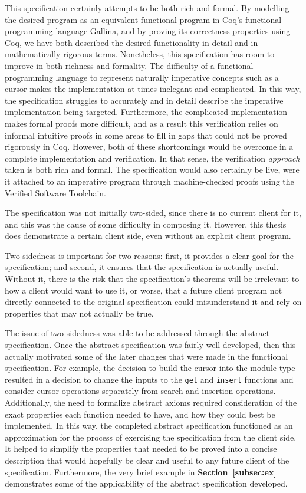 \documentclass[12pt]{article}
\begin{document}
This specification certainly attempts to be both rich and formal. By modelling the desired program as an equivalent functional program in Coq’s functional programming language Gallina, and by proving its correctness properties using Coq, we have both described the desired functionality in detail and in mathematically rigorous terms. Nonetheless, this specification has room to improve in both richness and formality. The difficulty of a functional programming language to represent naturally imperative concepts such as a cursor makes the implementation at times inelegant and complicated. In this way, the specification struggles to accurately and in detail describe the imperative implementation being targeted. Furthermore, the complicated implementation makes formal proofs more difficult, and as a result this verification relies on informal intuitive proofs in some areas to fill in gaps that could not be proved rigorously in Coq. However, both of these shortcomings would be overcome in a complete implementation and verification. In that sense, the verification \textit{approach} taken is both rich and formal. The specification would also certainly be live, were it attached to an imperative program through machine-checked proofs using the Verified Software Toolchain.

The specification was not initially two-sided, since there is no current client for it, and this was the cause of some difficulty in composing it. However, this thesis does demonstrate a certain client side, even without an explicit client program.

Two-sidedness is important for two reasons: first, it provides a clear goal for the specification; and second, it ensures that the specification is actually useful. Without it, there is the risk that the specification’s theorems will be irrelevant to how a client would want to use it, or worse, that a future client program not directly connected to the original specification could misunderstand it and rely on properties that may not actually be true.

The issue of two-sidedness was able to be addressed through the abstract specification. Once the abstract specification was fairly well-developed, then this actually motivated some of the later changes that were made in the functional specification. For example, the decision to build the cursor into the module type resulted in a decision to change the inputs to the \texttt{get} and \texttt{insert} functions and consider cursor operations separately from search and insertion operations. Additionally, the need to formalize abstract axioms required consideration of the exact properties each function needed to have, and how they could best be implemented. In this way, the completed abstract specification functioned as an approximation for the process of exercising the specification from the client side. It helped to simplify the properties that needed to be proved into a concise description that would hopefully be clear and useful to any future client of the specification. Furthermore, the very brief example in \textbf{Section~\ref{subsec:ex}} demonstrates some of the applicability of the abstract specification developed.
\end{document}
